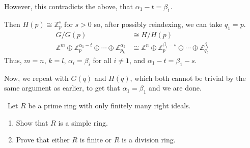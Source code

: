 \documentclass[12pt]{AlgebraQual}
\begin{document}
\begin{solution}
\begin{enumerate}[label=(\alph*)]
    However, this contradicts the above, that $\alpha_1-t=\beta_1.$ \contradiction

     Then $H(p)\cong\mathbb{Z}_p^s$ for $s>0$ so, after possibly reindexing, we can take $q_1=p.$ \begin{align*}
        G/G(p)&\cong H/H(p)\\
        \mathbb{Z}^m\oplus\mathbb{Z}_{p}^{\alpha_1-t}\oplus\cdots\oplus\mathbb{Z}_{p_k}^{\alpha_k}&\cong \mathbb{Z}^n\oplus\mathbb{Z}_{p}^{\beta_1-s}\oplus\cdots\oplus\mathbb{Z}_{q_l}^{\beta_l}
    \end{align*} Thus, $m=n$, $k=l$, $\alpha_i=\beta_i$ for all $i\not=1$, and $\alpha_1-t=\beta_1-s$.

    Now, we repeat with $G(q)$ and $H(q)$, which both cannot be trivial by the same argument as earlier, to get that $\alpha_1=\beta_1$ and we are done.
\end{enumerate}
\end{solution}
\newpage

\begin{problem} $\,$
Let $R$ be a prime ring with only finitely many right ideals.
\begin{enumerate}[label=(\alph*)]
    \item Show that $R$ is a simple ring.
    \item Prove that either $R$ is finite or $R$ is a division ring.
\end{enumerate}
\end{problem}
\end{document}
